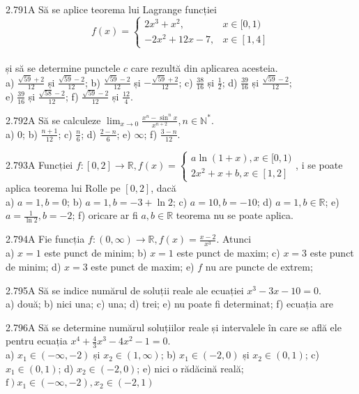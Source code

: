 \documentclass[11pt]{article}
\begin{document}
2.791A Să se aplice teorema lui Lagrange funcției $$f(x)= \begin{cases}2 x^{3}+x^{2}, & x \in[0,1) \\ -2 x^{2}+12 x-7, & x \in[1,4]\end{cases}$$\\și să se determine punctele $c$ care rezultă din aplicarea acesteia.\\ a) $\frac{\sqrt{59}+2}{12}$ și $\frac{\sqrt{59}-2}{12}$; b) $\frac{\sqrt{59}-2}{12}$ și $-\frac{\sqrt{59}+2}{12}$; c) $\frac{38}{16}$ și $\frac{1}{2}$; d) $\frac{39}{16}$ și $\frac{\sqrt{59}-2}{12}$;\\ e) $\frac{39}{16}$ și $\frac{\sqrt{58}-2}{12}$; f) $\frac{\sqrt{59}-2}{12}$ și $\frac{12}{4}$.

2.792A Să se calculeze $\lim _{x \rightarrow 0} \frac{x^{n}-\sin ^{n} x}{x^{n+2}}, n \in \mathbb{N}^{*}$.\\ a) $0$; b) $\frac{n+1}{12}$; c) $\frac{n}{6}$; d) $\frac{2-n}{6}$; e) $\infty$; f) $\frac{3-n}{12}$.

2.793A Funcției $f:[0,2] \rightarrow \mathbb{R}, f(x)=\left\{\begin{array}{l}a \ln (1+x), x \in[0,1) \\ 2 x^{2}+x+b, x \in[1,2]\end{array}\right.$, i se poate aplica teorema lui Rolle pe $[0,2]$, dacă\\ a) $a=1, b=0$; b) $a=1, b=-3+\ln 2$; c) $a=10, b=-10$; d) $a=1, b \in \mathbb{R}$; e) $a=\frac{1}{\ln 2}, b=-2$; f) oricare ar fi $a, b \in \mathbb{R}$ teorema nu se poate aplica.

2.794A Fie funcția $f:(0, \infty) \rightarrow \mathbb{R}, f(x)=\frac{x-2}{x^{3}}$. Atunci\\ a) $x=1$ este punct de minim; b) $x=1$ este punct de maxim; c) $x=3$ este punct de minim; d) $x=3$ este punct de maxim; e) $f$ nu are puncte de extrem;

2.795A Să se indice numărul de soluții reale ale ecuației $x^{3}-3 x-10=0$.\\ a) două; b) nici una; c) una; d) trei; e) nu poate fi determinat; f) ecuația are

2.796A Să se determine numărul soluțiilor reale și intervalele în care se află ele pentru ecuația $x^{4}+\frac{4}{3} x^{3}-4 x^{2}-1=0$.\\ a) $x_{1} \in(-\infty,-2)$ și $x_{2} \in(1, \infty)$; b) $x_{1} \in(-2,0)$ și $x_{2} \in(0,1)$; c) $x_{1} \in(0,1)$; d) $x_{2} \in(-2,0)$; e) nici o rădăcină reală; $\left.\mathrm{f}\right) x_{1} \in(-\infty,-2), x_{2} \in(-2,1)$
\end{document}
